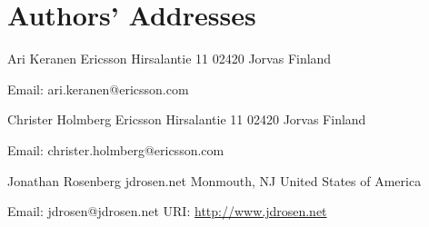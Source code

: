\documentclass{article}
\begin{document}
\section*{Authors' Addresses}

Ari Keranen Ericsson Hirsalantie 11 02420 Jorvas Finland

Email: ari.keranen@ericsson.com

Christer Holmberg Ericsson Hirsalantie 11 02420 Jorvas Finland

Email: christer.holmberg@ericsson.com

Jonathan Rosenberg jdrosen.net Monmouth, NJ United States of America

Email: jdrosen@jdrosen.net URI:   \url{http://www.jdrosen.net}
\end{document}
